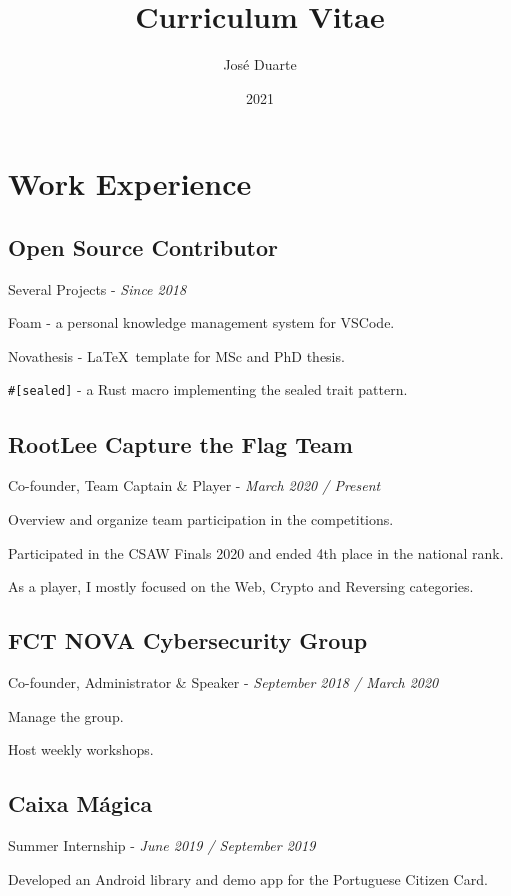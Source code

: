 \documentclass{article}
\title{Curriculum Vitae}
\author{José Duarte}
\date{2021}
\begin{document}
\maketitle
\section*{Work Experience}
\subsection*{Open Source Contributor}
Several Projects - \emph{Since 2018}
\begin{compactitem}
    \item Foam - a personal knowledge management system for VSCode.
    \item Novathesis - \LaTeX~template for MSc and PhD thesis.
    \item \texttt{\#[sealed]} - a Rust macro implementing the sealed trait pattern.
\end{compactitem}

\subsection*{RootLee Capture the Flag Team}
Co-founder, Team Captain \& Player - \emph{March 2020 / Present}
\begin{compactitem}
    \item Overview and organize team participation in the competitions.
    \item Participated in the CSAW Finals 2020 and ended 4th place in the national rank.
    \item As a player, I mostly focused on the Web, Crypto and Reversing categories.
\end{compactitem}

\subsection*{FCT NOVA Cybersecurity Group}
Co-founder, Administrator \& Speaker - \emph{September 2018 / March 2020}
\begin{compactitem}
    \item Manage the group.
    \item Host weekly workshops.
\end{compactitem}

\subsection*{Caixa Mágica}
Summer Internship - \emph{June 2019 / September 2019}
\begin{compactitem}
    \item Developed an Android library and demo app for the Portuguese Citizen Card.
\end{compactitem}
\end{document}
